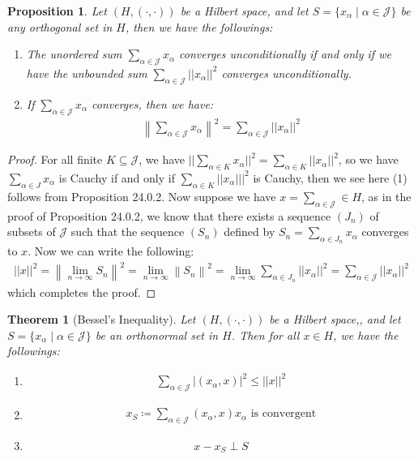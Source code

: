 \documentclass[11pt]{book}
\theoremstyle{break}
\theoremstyle{break}
\newtheorem{thm}{Theorem}[section]
\newtheorem{prop}[lem]{Proposition}
\begin{document}
\begin{prop}
Let $(H, (\cdot, \cdot))$ be a Hilbert space, and let $S = \{ x_\alpha \mid \alpha \in \mathcal{J}\}$ be any orthogonal set in $H$, then we have the followings:
\begin{enumerate}[topsep=3pt,itemsep=-1ex,partopsep=1ex,parsep=1ex]
\item The unordered sum $\sum_{\alpha \in \mathcal{J}}x_{\alpha}$ converges unconditionally if and only if we have the unbounded sum $\sum_{\alpha \in \mathcal{J}}||x_\alpha ||^2$ converges unconditionally. 
\item If $\sum_{\alpha \in \mathcal{J}}x_{\alpha}$ converges, then we have:
\begin{align*}
\left\| \sum_{\alpha \in \mathcal{J}} x_{\alpha }\right\|^2 = \sum_{\alpha \in \mathcal{J}}||x_{\alpha}||^2
\end{align*}
\end{enumerate}
\end{prop}
\begin{proof}
For all finite $K \subseteq \mathcal{J}$, we have $||\sum_{\alpha \in K}x_{\alpha } ||^2 = \sum_{\alpha \in K}||x_\alpha||^2$, so we have $\sum_{\alpha \in J}x_\alpha$ is Cauchy if and only if $\sum_{\alpha \in K}||x_\alpha|||^2$ is Cauchy, then we see here (1) follows from Proposition 24.0.2. Now suppose we have $x = \sum_{\alpha \in \mathcal{J}} \in H$, as in the proof of Proposition 24.0.2, we know that there exists a sequence $(J_n)$ of subsets of $\mathcal{J}$ such that the sequence $(S_n)$ defined by $S_n = \sum_{\alpha \in J_n}x_\alpha$ converges to $x$. Now we can write the following:
\begin{align*}
||x||^2 = \left\| \lim_{n \to \infty} S_n \right\|^2 = \lim_{n \to \infty}\left\|S_n\right\|^2 = \lim_{n\to \infty} \sum_{\alpha \in J_n} ||x_\alpha||^2= \sum_{\alpha \in \mathcal{J}}||x_\alpha||^2
\end{align*}
which completes the proof. 
\end{proof}
\newpage
\begin{thm}[Bessel's Inequality]
Let $(H,(\cdot,\cdot))$ be a Hilbert space,, and let $S=\{x_\alpha \mid \alpha \in \mathcal{J}\}$ be an orthonormal set in $H$. Then for all $x \in H$, we have the followings:
\begin{enumerate}[topsep=3pt,itemsep=-1ex,partopsep=1ex,parsep=1ex]
\item \begin{align*}
\sum_{\alpha \in \mathcal{J}} |(x_\alpha, x)|^2 \leq ||x||^2
\end{align*}
\item \begin{align*}
x_S \coloneqq \sum_{\alpha \in \mathcal{J}}(x_\alpha ,x) x_\alpha \text{ is convergent}
\end{align*}
\item \begin{align*}
 x - x_S \perp S
\end{align*}
\end{enumerate}
\end{thm}
\end{document}
